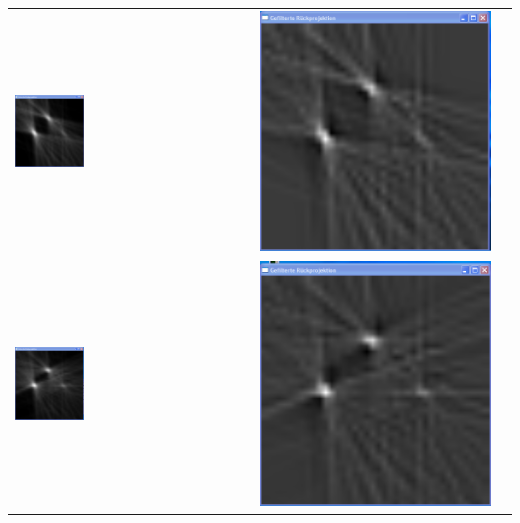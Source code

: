 \begin{longtable}{p{7cm}p{7cm}c}
                \includegraphics[width=0.3\textwidth, height=0.2\textheight]{pic/Einzelfenster_Bilder/unbekannte_Quelle/unbek3einf_prj.png}
                & 
                \includegraphics[width=.3\textwidth, height=0.2\textheight]{pic/Einzelfenster_Bilder/unbekannte_Quelle/unbek3gef_prj.png}\\               
                \includegraphics[width=0.3\textwidth, height=0.2\textheight]{pic/Einzelfenster_Bilder/unbekannte_Quelle/unbek4einf_prj.png}
                & 
                \includegraphics[width=.3\textwidth, height=0.2\textheight]{pic/Einzelfenster_Bilder/unbekannte_Quelle/unbek4gef_prj.png} \\
            \end{longtable}
